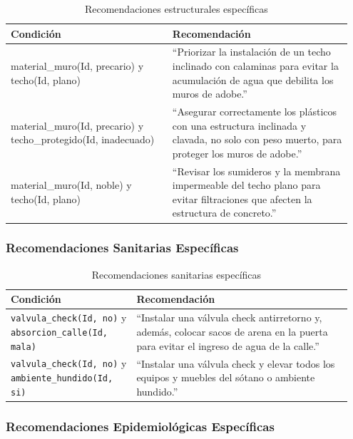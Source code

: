 \documentclass[12pt, letterpaper]{article}
\begin{document}
\begin{table}[H]
\centering
\small
\caption{Recomendaciones estructurales específicas}
\label{tab:rec_estructurales_esp}
\begin{tabular}{@{}>{\RaggedRight}p{0.45\linewidth}>{\RaggedRight}p{0.50\linewidth}@{}}
\toprule
\textbf{Condición} & \textbf{Recomendación} \\ \midrule
\ttfamily material\_muro(Id, precario) y \ttfamily techo(Id, plano) & ``Priorizar la instalación de un techo inclinado con calaminas para evitar la acumulación de agua que debilita los muros de adobe.'' \\ \addlinespace
\ttfamily material\_muro(Id, precario) y \ttfamily techo\_protegido(Id, inadecuado) & ``Asegurar correctamente los plásticos con una estructura inclinada y clavada, no solo con peso muerto, para proteger los muros de adobe.'' \\ \addlinespace
\ttfamily material\_muro(Id, noble) y \ttfamily techo(Id, plano) & ``Revisar los sumideros y la membrana impermeable del techo plano para evitar filtraciones que afecten la estructura de concreto.'' \\ \bottomrule
\end{tabular}
\end{table}

\subsubsection*{Recomendaciones Sanitarias Específicas}

\begin{table}[H]
\centering
\caption{Recomendaciones sanitarias específicas}
\label{tab:rec_sanitarias_esp}
\begin{tabular}{@{}p{0.35\linewidth}p{0.60\linewidth}@{}}
\toprule
\textbf{Condición} & \textbf{Recomendación} \\ \midrule
\texttt{valvula\_check(Id, no)} y \texttt{absorcion\_calle(Id, mala)} & ``Instalar una válvula check antirretorno y, además, colocar sacos de arena en la puerta para evitar el ingreso de agua de la calle.'' \\
\texttt{valvula\_check(Id, no)} y \texttt{ambiente\_hundido(Id, si)} & ``Instalar una válvula check y elevar todos los equipos y muebles del sótano o ambiente hundido.'' \\ \bottomrule
\end{tabular}
\end{table}

\subsubsection*{Recomendaciones Epidemiológicas Específicas}
\end{document}
